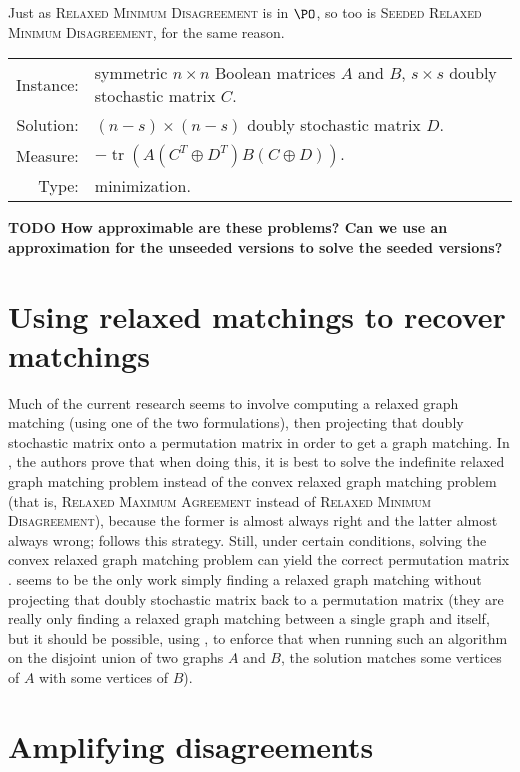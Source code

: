 \documentclass{article}
\newcommand{\todo}[1]{\textbf{TODO #1}}
\newcommand{\1}{\mathbf{1}}
\newcommand{\RMD}{\textsc{Relaxed Minimum Disagreement}}
\newcommand{\RMA}{\textsc{Relaxed Maximum Agreement}}
\newcommand{\SRMD}{\textsc{Seeded Relaxed Minimum Disagreement}}
\newcommand{\SRMA}{\textsc{Seeded Relaxed Maximum Agreement}}
\DeclareMathOperator{\tr}{tr}
\begin{document}
Just as \RMD{} is in $\PO$, so too is \SRMD{}, for the same reason.

\begin{definition}[\SRMA{}]
  \mbox{}

  \begin{tabular}{r p{9.3cm}}
    Instance: & symmetric $n \times n$ Boolean matrices $A$ and $B$, $s \times s$ doubly stochastic matrix $C$. \\
    Solution: & $(n - s) \times (n - s)$ doubly stochastic matrix $D$. \\
    Measure: & $-\tr(A (C^T \oplus D^T) B (C \oplus D))$. \\
    Type: & minimization.
  \end{tabular}
\end{definition}

\todo{
  How approximable are these problems?
  Can we use an approximation for the unseeded versions to solve the seeded versions?
}

\section{Using relaxed matchings to recover matchings}

Much of the current research seems to involve computing a relaxed graph matching (using one of the two formulations), then projecting that doubly stochastic matrix onto a permutation matrix in order to get a graph matching.
In \autocite{relax14}, the authors prove that when doing this, it is best to solve the indefinite relaxed graph matching problem instead of the convex relaxed graph matching problem (that is, \RMA{} instead of \RMD{}), because the former is almost always right and the latter almost always wrong; \autocite{v14} follows this strategy.
Still, under certain conditions, solving the convex relaxed graph matching problem can yield the correct permutation matrix \autocite{abk14, fs14}.
\autocite{kmgg14} seems to be the only work simply finding a relaxed graph matching without projecting that doubly stochastic matrix back to a permutation matrix (they are really only finding a relaxed graph matching between a single graph and itself, but it should be possible, using \autocite{gkms14}, to enforce that when running such an algorithm on the disjoint union of two graphs $A$ and $B$, the solution matches some vertices of $A$ with some vertices of $B$).

\section{Amplifying disagreements}
\end{document}
